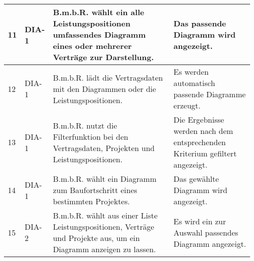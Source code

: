 \begin{longtable}[c]{|p{1cm}|p{3cm}|p{4cm}|p{6cm}|}
    11           & DIA-1                      & B.m.b.R. wählt ein alle Leistungspositionen umfassendes Diagramm eines oder mehrerer Verträge zur Darstellung.     & Das passende Diagramm wird angezeigt.                                                                                                                                      \\ \hline
    12           & DIA-1                      & B.m.b.R. lädt die Vertragsdaten mit den Diagrammen oder die Leistungspositionen.                                   & Es werden automatisch passende Diagramme erzeugt.                                                                                                                          \\ \hline
    13           & DIA-1                      & B.m.b.R. nutzt die Filterfunktion bei den Vertragsdaten, Projekten und Leistungspositionen.                        & Die Ergebnisse werden nach dem entsprechenden Kriterium gefiltert angezeigt.                                                                                               \\ \hline
    14           & DIA-1                      & B.m.b.R. wählt ein Diagramm zum Baufortschritt eines bestimmten Projektes.                                         & Das gewählte Diagramm wird angezeigt.                                                                                                                                      \\ \hline
    15           & DIA-2                      & B.m.b.R. wählt aus einer Liste Leistungspositionen, Verträge und Projekte aus, um ein Diagramm anzeigen zu lassen. & Es wird ein zur Auswahl passendes Diagramm angezeigt.                                                                                                                      \\ \hline
\end{longtable}
